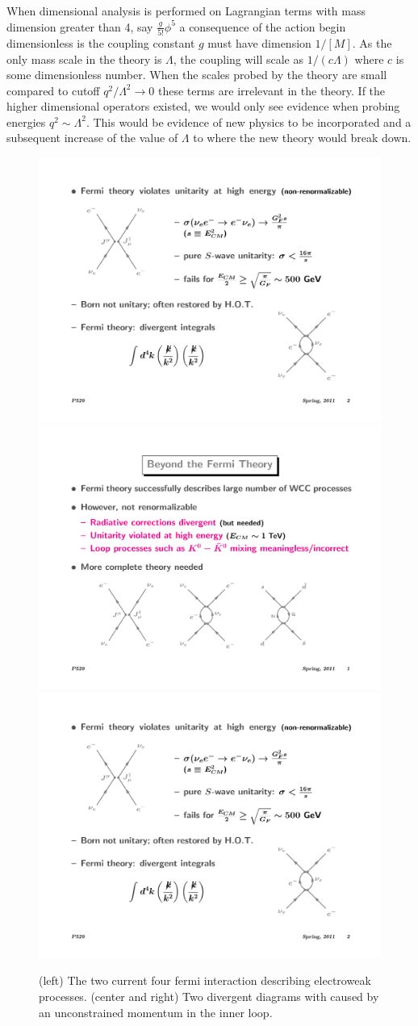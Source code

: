 When dimensional analysis is performed on Lagrangian terms with mass dimension greater than 4, say $\frac{g}{5!}\phi^5$ 
a consequence of the action begin dimensionless is the coupling constant $g$ must have dimension $1/[M]$. As the only
mass scale in the theory is $\Lambda$,  
the coupling will scale as $1/ (c \Lambda)$ where $c$ is some dimensionless number. 
When the scales probed by the theory are small compared to cutoff $q^2/\Lambda^2 \rightarrow 0$
these terms are irrelevant in the theory. If the higher dimensional operators existed, we would only
see evidence when probing energies $q^2 \sim \Lambda^2$.  This would be evidence of new physics to 
be incorporated and a subsequent increase of the value of $\Lambda$ to where the new theory would break down. 

\begin{figure}
\begin{center}
\includegraphics[width=.25\textwidth]{pics/fermi_theory}
\includegraphics[width=.25\textwidth]{pics/fermi_diverge_ds}
\includegraphics[width=.25\textwidth]{pics/fermi_divergence}
\end{center}
\caption{(left) The two current four fermi interaction describing electroweak processes. (center and right) Two divergent diagrams with caused by
an unconstrained momentum in the inner loop.}
\label{fig:fermi_divergence}
\end{figure}

